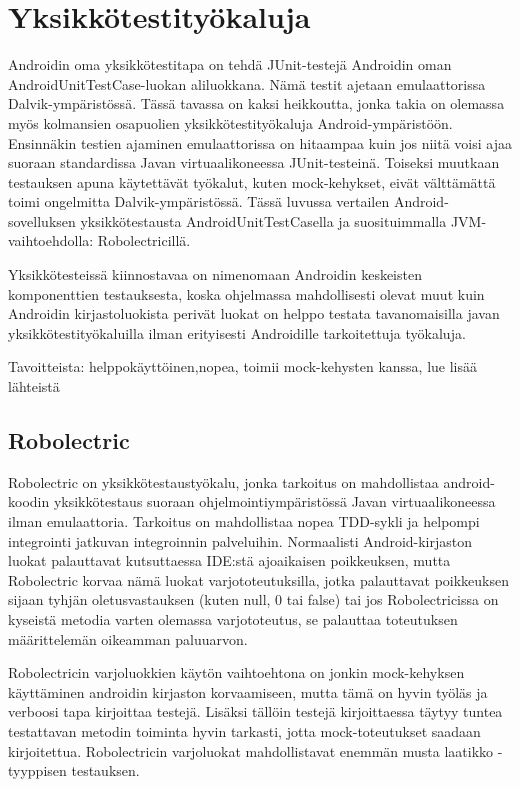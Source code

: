 \section{Yksikkötestityökaluja}

Androidin oma yksikkötestitapa on tehdä JUnit-testejä Androidin oman AndroidUnitTestCase-luokan aliluokkana. Nämä testit ajetaan emulaattorissa Dalvik-ympäristössä. Tässä tavassa on kaksi heikkoutta, jonka takia on olemassa myös kolmansien osapuolien yksikkötestityökaluja Android-ympäristöön. Ensinnäkin testien ajaminen emulaattorissa on hitaampaa kuin jos niitä voisi ajaa suoraan standardissa Javan virtuaalikoneessa JUnit-testeinä. Toiseksi muutkaan testauksen apuna käytettävät työkalut, kuten mock-kehykset, eivät välttämättä toimi ongelmitta Dalvik-ympäristössä. Tässä luvussa vertailen Android-sovelluksen yksikkötestausta AndroidUnitTestCasella ja suosituimmalla JVM-vaihtoehdolla: Robolectricillä.

Yksikkötesteissä kiinnostavaa on nimenomaan Androidin keskeisten komponenttien testauksesta, koska ohjelmassa mahdollisesti olevat muut kuin Androidin kirjastoluokista perivät luokat on helppo testata tavanomaisilla javan yksikkötestityökaluilla ilman erityisesti Androidille tarkoitettuja työkaluja.

Tavoitteista: helppokäyttöinen,nopea, toimii mock-kehysten kanssa, lue lisää lähteistä

\subsection{Robolectric}

Robolectric on yksikkötestaustyökalu, jonka tarkoitus on mahdollistaa android-koodin yksikkötestaus suoraan ohjelmointiympäristössä Javan virtuaalikoneessa ilman emulaattoria. Tarkoitus on mahdollistaa nopea TDD-sykli ja helpompi integrointi jatkuvan integroinnin palveluihin. Normaalisti Android-kirjaston luokat palauttavat kutsuttaessa IDE:stä ajoaikaisen poikkeuksen, mutta Robolectric korvaa nämä luokat varjototeutuksilla, jotka palauttavat poikkeuksen sijaan tyhjän oletusvastauksen (kuten null, 0 tai false) tai jos Robolectricissa on kyseistä metodia varten olemassa varjototeutus, se palauttaa toteutuksen määrittelemän oikeamman paluuarvon.

Robolectricin varjoluokkien käytön vaihtoehtona on jonkin mock-kehyksen käyttäminen androidin kirjaston korvaamiseen, mutta tämä on hyvin työläs ja verboosi tapa kirjoittaa testejä. Lisäksi tällöin testejä kirjoittaessa täytyy tuntea testattavan metodin toiminta hyvin tarkasti, jotta mock-toteutukset saadaan kirjoitettua. Robolectricin varjoluokat mahdollistavat enemmän musta laatikko -tyyppisen testauksen. \cite{robolectric}

